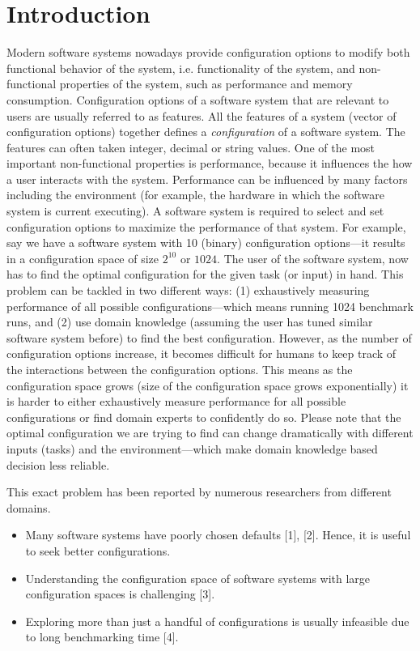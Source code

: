 \chapter{Introduction}
\label{chapter:one}


Modern software systems nowadays provide configuration options to modify
both functional behavior of the system, i.e. functionality of the system, and non-functional properties of the system, such as performance and memory
consumption. 
Configuration options of a software system that are relevant to users are usually referred to as
features. All the features of a system (vector of configuration options) together defines a \textit{configuration} of a software system. The features can often taken integer, decimal or string values.  One of the most important non-functional properties is performance, because it  influences the how a user interacts with the system. 
Performance can be influenced by many factors including the environment (for example, the hardware in which the software system is current executing).  A software system is required to select and set configuration options to maximize the performance of that system. For example, say we have a software system with 10 (binary) configuration options---it results in a configuration space of size $2^{10}$ or $1024$. The user of the software system, now has to find the optimal configuration for the given task (or input) in hand. 
This problem can be tackled in two different ways: (1) exhaustively measuring performance of all possible configurations---which means running 1024 benchmark runs, and (2) use domain knowledge (assuming the user has tuned similar software system before) to find the best configuration. 
However, as the number of configuration options increase, it
becomes difficult for humans to keep track of the interactions between the configuration options. This means as the configuration space grows (size of the configuration space grows exponentially) it is harder to either exhaustively measure performance for all possible configurations or find domain experts to confidently do so. Please note that the optimal configuration we are trying to find can change dramatically with different inputs (tasks) and the environment---which make domain knowledge based decision less reliable. 

This exact problem has been reported by numerous researchers from different domains.
\begin{itemize}
\item Many software systems have poorly chosen defaults [1], [2]. Hence, it is useful to seek better configurations.
\item Understanding the configuration space of software systems with large configuration spaces is challenging [3].
\item Exploring more than just a handful of configurations is usually infeasible due to long benchmarking time [4].
\end{itemize}


